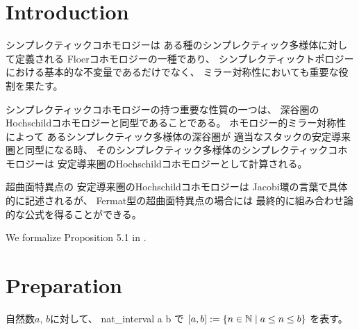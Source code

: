 %

\chapter{Introduction}

シンプレクティックコホモロジーは
ある種のシンプレクティック多様体に対して定義される
Floerコホモロジーの一種であり、
シンプレクティックトポロジーにおける基本的な不変量であるだけでなく、
ミラー対称性においても重要な役割を果たす。

シンプレクティックコホモロジーの持つ重要な性質の一つは、
深谷圏のHochschildコホモロジーと同型であることである。
ホモロジー的ミラー対称性によって
あるシンプレクティック多様体の深谷圏が
適当なスタックの安定導来圏と同型になる時、
そのシンプレクティック多様体のシンプレクティックコホモロジーは
安定導来圏のHochschildコホモロジーとして計算される。

超曲面特異点の
安定導来圏のHochschildコホモロジーは
Jacobi環の言葉で具体的に記述されるが、
Fermat型の超曲面特異点の場合には
最終的に組み合わせ論的な公式を得ることができる。

We formalize Proposition 5.1 in \cite{2406.15915}.


\chapter{Preparation}

\begin{definition}
\label{def:nat_interval}
\leanok
自然数$a$, $b$に対して、
\textsf{nat\_interval a b}
で
$
[a, b] := \{n \in \mathbb{N} \mid a \le n \le b\}
$
を表す。
\end{definition}

